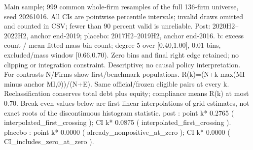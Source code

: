 \begin{threeparttable}
\begin{tablenotes}[flushleft]
\item[] Main sample; 999 common whole-firm resamples of the full 136-firm universe, seed 20261016. All CIs are pointwise percentile intervals; invalid draws omitted and counted in CSV; fewer than 90 percent valid is unreliable. Post: 2020H2--2022H2, anchor end-2019; placebo: 2017H2--2019H2, anchor end-2016. b: excess count / mean fitted mass-bin count; degree 5 over [0.40,1.00], 0.01 bins, excluded/mass window [0.66,0.70). Zero bins and final right edge retained; no clipping or integration constraint. Descriptive; no causal policy interpretation. For contrasts N/Firms show first/benchmark populations. R(k)=(N+k max(MI minus anchor MI,0))/(N+E). Same official/frozen eligible pairs at every k. Reclassification conserves total debt plus equity; compliance means R(k) at most 0.70. Break-even values below are first linear interpolations of grid estimates, not exact roots of the discontinuous histogram statistic. post : point k* 0.2765 ( interpolated\_first\_crossing ); CI k* 0.0875 ( interpolated\_first\_crossing ). placebo : point k* 0.0000 ( already\_nonpositive\_at\_zero ); CI k* 0.0000 ( CI\_includes\_zero\_at\_zero ).
\end{tablenotes}
\end{threeparttable}
\endgroup
\par\medskip
\begingroup\scriptsize\setlength{\tabcolsep}{3pt}
